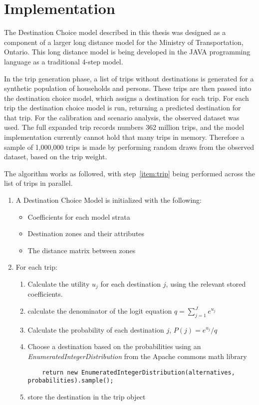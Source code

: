 \section{Implementation}
\label{section:implementation}
The Destination Choice model described in this thesis was designed as a component of a larger long distance model for the Ministry of Transportation, Ontario. This long distance model is being developed in the JAVA programming language as a traditional 4-step model. 

In the trip generation phase, a list of trips without destinations is generated for a synthetic population of households and persons. These trips are then passed into the destination choice model, which assigns a destination for each trip. For each trip the destination choice model is run, returning a predicted destination for that trip. For the calibration and scenario analysis, the observed dataset was used. The full expanded trip records numbers 362 million trips, and the model implementation currently cannot hold that many trips in memory. Therefore a sample of 1,000,000 trips is made by performing random draws from the observed dataset, based on the trip weight.

The algorithm works as followed, with step~\ref{item:trip} being performed across the list of trips in parallel. 

\begin{enumerate}
\item A Destination Choice Model is initialized with the following:
	\begin{itemize}
	\item Coefficients for each model strata
	\item Destination zones and their attributes
	\item The distance matrix between zones
	\end{itemize}
\item \label{item:trip} For each trip:
	\begin{enumerate}
	\item Calculate the utility $u_j$ for each destination $j$, using the relevant stored coefficients.
	\item \label{item:denom} calculate the denominator of the logit equation $q = {\sum_{j=1}^{J} e^{u_j}}
	$
	\item Calculate the probability of each destination $j$, $P(j) = e^{u_j} / q $
	\item Choose a destination based on the probabilities using an \textit{EnumeratedIntegerDistribution} from the Apache commons math library 
	\begin{verbatim}
	return new EnumeratedIntegerDistribution(alternatives, probabilities).sample();
	\end{verbatim}

	\item store the destination in the trip object
	\end{enumerate}
\end{enumerate}

